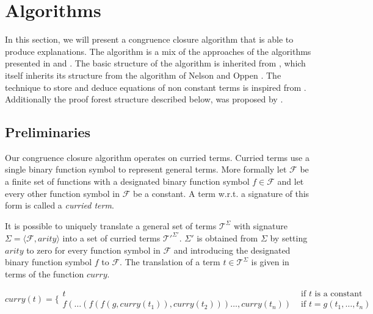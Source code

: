 \section*{Algorithms}
\label{sec:algorithm}


In this section, we will present a congruence closure algorithm that is able to produce explanations.
The algorithm is a mix of the approaches of the algorithms presented in \cite{Fontaine2004} and \cite{Nieuwenhuis2005,Nieuwenhuis2007}.
The basic structure of the algorithm is inherited from \cite{Fontaine2004}, which itself inherits its structure from the algorithm of Nelson and Oppen \cite{Nelson1980}.
The technique to store and deduce equations of non constant terms is inspired from \cite{Nieuwenhuis2005,Nieuwenhuis2007}.
Additionally the proof forest structure described below, was proposed by \cite{Nieuwenhuis2005,Nieuwenhuis2007}.

\subsection*{Preliminaries}

Our congruence closure algorithm operates on curried terms.
Curried terms use a single binary function symbol to represent general terms.
More formally let $\mathcal{F}$ be a finite set of functions with a designated binary function symbol $f \in \mathcal{F}$ and let every other function symbol in $\mathcal{F}$ be a constant.
A term w.r.t. a signature of this form is called a \emph{curried term}.

It is possible to uniquely translate a general set of terms $\mathcal{T}^{\Sigma}$ with signature $\Sigma = \langle \mathcal{F},arity \rangle$ into a set of curried terms $\mathcal{T'}^{\Sigma'}$.
$\Sigma'$ is obtained from $\Sigma$ by setting $arity$ to zero for every function symbol in $\mathcal{F}$ and introducing the designated binary function symbol $f$ to $\mathcal{F}$.
The translation of a term $t \in \mathcal{T}^{\Sigma}$ is given in terms of the function $curry$.

$$
curry(t) = \Big\{
\begin{array}{ll}
	t & \text{ if } t \text{ is a constant }\\
	f(\ldots (f(f(g,curry(t_1)),curry(t_2)))\ldots,curry(t_n)) &\text{ if } t = g(t_1,\ldots, t_n)
\end{array}
$$

